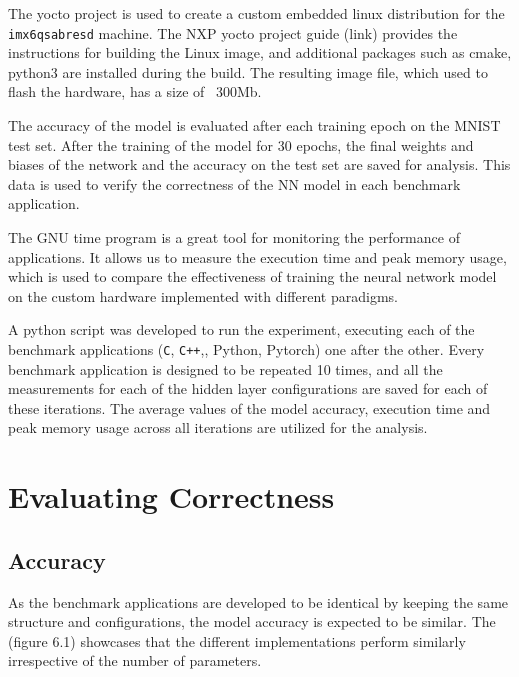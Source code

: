 The yocto project is used to create a custom embedded linux distribution for the \texttt{imx6qsabresd} machine. The NXP yocto project guide (link) provides the instructions for building the Linux image, and additional packages such as cmake, python3 are installed during the build. The resulting image file, which used to flash the hardware, has a size of ~300Mb.

The accuracy of the model is evaluated after each training epoch on the MNIST test set. After the training of the model for 30 epochs, the final weights and biases of the network and the accuracy on the test set are saved for analysis. This data is used to verify the correctness of the NN model in each benchmark application.

The GNU time program is a great tool for monitoring the performance of applications. It allows us to measure the execution time and peak memory usage, which is used to compare the effectiveness of training the neural network model on the custom hardware implemented with different paradigms.

A python script was developed to run the experiment, executing each of the benchmark applications (\verb!C!, \verb!C++!,, Python, Pytorch) one after the other. Every benchmark application is designed to be repeated 10 times, and all the measurements for each of the hidden layer configurations are saved for each of these iterations. The average values of the model accuracy, execution time and peak memory usage across all iterations are utilized for the analysis.



\section{Evaluating Correctness}
\subsection{Accuracy}
As the benchmark applications are developed to be identical by keeping the same structure and configurations, the model accuracy is expected to be similar. The (figure 6.1) showcases that the different implementations perform similarly irrespective of the number of parameters.

